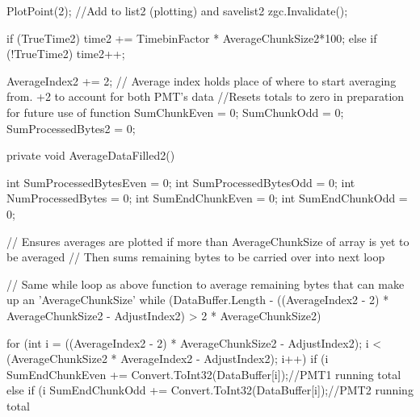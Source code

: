 {{{{                PlotPoint(2); //Add to list2 (plotting) and savelist2
                zgc.Invalidate();

                if (TrueTime2)
                {
                    time2 += TimebinFactor * AverageChunkSize2*100;
                }
                else if (!TrueTime2)
                {
                    time2++;
                }

                AverageIndex2 += 2; // Average index holds place of where to start averaging from. +2 to account for both PMT's data
                //Resets totals to zero in preparation for future use of function
                SumChunkEven = 0;
                SumChunkOdd = 0;
                SumProcessedBytes2 = 0;
            }




        }
        private void AverageDataFilled2()
        {

            int SumProcessedBytesEven = 0;
            int SumProcessedBytesOdd = 0;
            int NumProcessedBytes = 0;
            int SumEndChunkEven = 0;
            int SumEndChunkOdd = 0;

            // Ensures averages are plotted if more than AverageChunkSize of array is yet to be averaged
            // Then sums remaining bytes to be carried over into next loop

            // Same while loop as above function to average remaining bytes that can make up an 'AverageChunkSize'
            while (DataBuffer.Length - ((AverageIndex2 - 2) * AverageChunkSize2 - AdjustIndex2) > 2 * AverageChunkSize2)
            {

                for (int i = ((AverageIndex2 - 2) * AverageChunkSize2 - AdjustIndex2); i < (AverageChunkSize2 * AverageIndex2 - AdjustIndex2); i++)
                {
                    if (i %
                    {
                        SumEndChunkEven += Convert.ToInt32(DataBuffer[i]);//PMT1 running total
                    }
                    else if (i %
                    {
                        SumEndChunkOdd += Convert.ToInt32(DataBuffer[i]);//PMT2 running total
                    }
                }

}}}}
